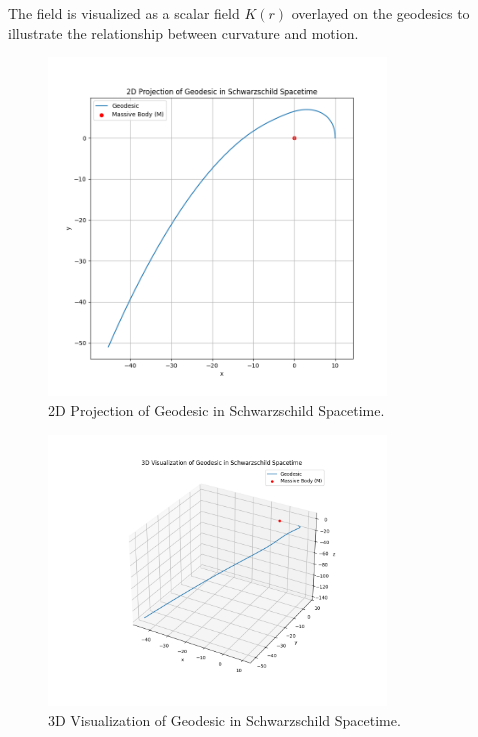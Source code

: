 \documentclass[12pt]{article}
\begin{document}
The field is visualized as a scalar field \(K(r)\) overlayed on the geodesics to illustrate the relationship between curvature and motion.

\begin{figure}[h]
    \centering
    \includegraphics[width=0.8\textwidth]{geodesic_2d_projection.png}
    \caption{2D Projection of Geodesic in Schwarzschild Spacetime.}
    \label{fig:2d_projection}
\end{figure}

\begin{figure}[h]
    \centering
    \includegraphics[width=0.8\textwidth]{geodesic_3d_trajectory.png}
    \caption{3D Visualization of Geodesic in Schwarzschild Spacetime.}
    \label{fig:3d_trajectory}
\end{figure}
\end{document}
